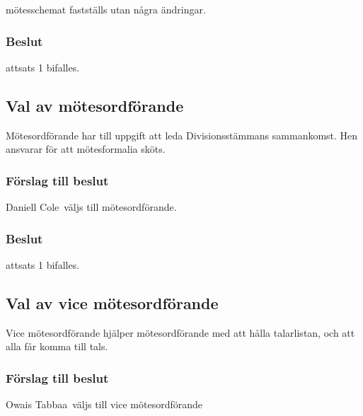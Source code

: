 \documentclass[protokoll]{dvd}
\def\ordf{Daniell Cole}
\def\kassa{Owais Tabbaa}
\begin{document}
\begin{attsatser}
    \item mötesschemat fastställs utan några ändringar.
\end{attsatser}

\subsubsection*{Beslut}
\begin{attsatser}
    \item attsats 1 bifalles.
\end{attsatser}

\subsection{Val av mötesordförande}

Mötesordförande har till uppgift att leda Divisionsstämmans sammankomst.
Hen ansvarar för att mötesformalia sköts.


\subsubsection*{Förslag till beslut}
\begin{attsatser}
    \item \ordf\ väljs till mötesordförande.
\end{attsatser}

\subsubsection*{Beslut}
\begin{attsatser}
    \item attsats 1 bifalles.
\end{attsatser}

\subsection{Val av vice mötesordförande}

Vice mötesordförande hjälper mötesordförande med att hålla talarlistan, och att alla får komma till tals.

\subsubsection*{Förslag till beslut}
\begin{attsatser}
    \item \kassa\ väljs till vice mötesordförande
\end{attsatser}
\end{document}
